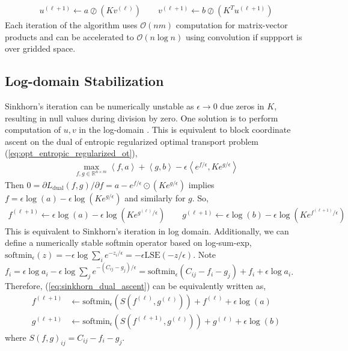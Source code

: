 \documentclass{6838publ}
\newcommand\sO{\ensuremath{\mathcal{O}}}
\newcommand\R{\ensuremath{\mathbb{R}}} %
\newcommand\inner[2]{\ensuremath{\left< #1, #2 \right>}} %
\DeclareMathOperator*{\diag}{diag} %
\begin{document}
\begin{align}
    u^{(\ell+1)} 
        \leftarrow a \oslash (Kv^{(\ell)}) 
    \quad\quad
    v^{(\ell+1)}
        \leftarrow b \oslash (K^Tu^{(\ell+1)})
\end{align}
Each iteration of the algorithm uses $\sO(nm)$ computation for matrix-vector products and can be accelerated to $\sO(n\log n)$ using convolution if suppport is over gridded space. 
\subsection{Log-domain Stabilization}

Sinkhorn's iteration can be numerically unstable as $\epsilon\to 0$ due zeros in $K$, resulting in null values during division by zero. One solution is to perform computation of $u,v$ in the log-domain \cite{chizatScalingAlgorithmsUnbalanced2017, schmitzerStabilizedSparseScaling2019}. This is equivalent to block coordinate ascent on the dual of entropic regularized optimal transport problem (\ref{eq:opt_entropic_regularized_ot}),
\begin{align}
    \max_{f,g\in\R^{n\times m}} \inner{f}{a} + \inner{g}{b} - \epsilon\inner{e^{f/\epsilon}}{Ke^{g/\epsilon}}
\end{align}
Then $0 = \partial L_{\text{dual}}(f,g)/\partial f = a - e^{f/\epsilon} \odot (Ke^{g/\epsilon})$ implies $f = \epsilon \log(a) - \epsilon \log(Ke^{g/\epsilon})$ and similarly for $g$. So,
\begin{align}
    f^{(\ell+1)}
        \leftarrow \epsilon \log(a) - \epsilon\log(Ke^{g^{(\ell)}/\epsilon})
    \quad\quad
    g^{(\ell+1)}
        \leftarrow \epsilon \log(b) - \epsilon\log(Ke^{f^{(\ell+1)}/\epsilon})
    \label{eq:sinkhorn_dual_ascent}
\end{align}
This is equivalent to Sinkhorn's iteration in log domain. Additionally, we can define a numerically stable softmin operator based on log-sum-exp, $\text{softmin}_{\epsilon}(z) = - \epsilon \log \sum_{i} e^{-z_i/\epsilon} = -\epsilon \text{LSE}(-z/\epsilon)$. Note $f_i = \epsilon \log a_i - \epsilon \log \sum_j e^{-(C_{ij}-g_j)/\epsilon} =\text{softmin}_{\epsilon}(C_{ij}-f_i-g_j) + f_i +  \epsilon \log a_i$. Therefore, (\ref{eq:sinkhorn_dual_ascent}) can be equivalently written as,
\begin{align}
    f^{(\ell+1)}
        &\leftarrow \text{softmin}_{\epsilon} (S(f^{(\ell)}, g^{(\ell)})) + f^{(\ell)} + \epsilon \log(a) \\ 
    g^{(\ell+1)}
        &\leftarrow \text{softmin}_{\epsilon} (S(f^{(\ell+1)}, g^{(\ell)})) + g^{(\ell)} + \epsilon \log(b)
    \label{eq:sinkhorn_dual_ascent2}
\end{align}
where $S(f,g)_{ij} = C_{ij}-f_i-g_j$. 
\end{document}

